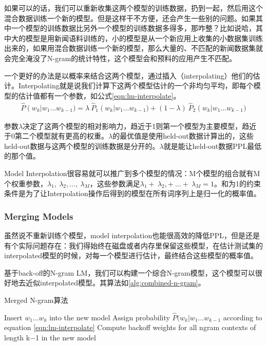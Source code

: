 {如果可以的话，我们可以重新收集这两个模型的训练数据，扔到一起，然后用这个混合数据训练一个新的模型。但是这样干不方便，还会产生一些别的问题。如果其中一个模型的训练数据比另外一个模型的训练数据多得多，那咋整？比如说哈，其中大的模型是用新闻语料训练的，小的模型是从一个新应用上收集的小数据集训练出来的，如果用混合数据训练一个新的模型，那么大量的、不匹配的新闻数据集就会完全淹没了N-gram的统计特性，这个模型会和预料的应用产生不匹配。

一个更好的办法是以概率来结合这两个模型，通过插入（interpolating）他们的估计。Interpolating就是说我们计算下这两个模型估计的一个非均匀平均，即每个模型的估计值都有一个参数，如公式\ref{eqn:lm-interpolate}。
\begin{align}
\label{eqn:lm-interpolate}
\hat{P}\left( w_{k} \right|w_{1}\ldots w_{k - 1}) = \lambda\ {\hat{P}}_{1}\left( w_{k} \right|w_{1}\ldots w_{k - 1}) + (1 - \lambda)\ {\hat{P}}_{2}\left( w_{k} \right|w_{1}\ldots w_{k - 1})
\end{align}

参数$\lambda$决定了这两个模型的相对影响力，趋近于1则第一个模型为主要模型，趋近于0第二个模型就有更高的权重。$\lambda$的最优值是使用held-out数据计算出的，这些held-out数据与这两个模型的训练数据是分开的。$\lambda$就是能让held-out数据PPL最低的那个值。

Model Interpolation很容易就可以推广到多个模型的情况：M个模型的组合就有M个权重参数，$\lambda_{1},\ \lambda_{2},\ldots,\ \lambda_{M}$，这些参数满足$\lambda_{1} + \ \lambda_{2}, + \ \ldots + \ \lambda_{M} = 1$。和为1的约束条件是为了让Interpolation操作后得到的模型在所有词序列上是归一化的概率值。
\subsubsection{Merging Models}
虽然说不重新训练个模型，model interpolation也能很高效的降低PPL，但是还是有个实际问题存在：我们得始终在磁盘或者内存里保留这些模型，在估计测试集的interpolated模型的时候，对每一个模型进行估计，最终结合这些模型的概率值。

基于back-off的N-gram LM，我们可以构建一个综合N-gram模型，这个模型可以很好地去近似interpolated模型。其算法如\ref{alg:combined-n-gram}。
\begin{algorithm}
\caption{Merged N-gram算法} 
\label{alg:combined-n-gram}
\begin{algorithmic}[1]
		\STATE Insert $w_1\ldots{w_k}$ into the new model
		\STATE  Assign probability $\hat{P}(w_k|w_1\ldots{w_{k-1}}$ according to equation \ref{eqn:lm-interpolate}
	\ENDFOR
	\STATE Compute backoff weights for all ngram contexts of length k−1 in the new model
\ENDFOR
\end{algorithmic}
\end{algorithm}

}
